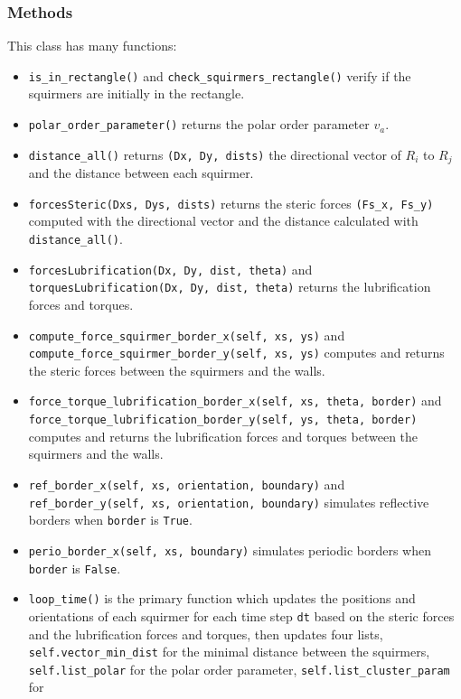 \documentclass{article}
\begin{document}
\subsubsection*{Methods}
This class has many functions:
\begin{itemize}
   \item \texttt{is\_in\_rectangle()} and \texttt{check\_squirmers\_rectangle()} verify if the squirmers 
    are initially in the rectangle.
   \item \texttt{polar\_order\_parameter()} returns the polar order parameter $v_a$.
   \item \texttt{distance\_all()} returns \texttt{(Dx, Dy, dists)} the directional vector of $R_{i}$ to $R_{j}$ 
   and the distance between each squirmer.
   \item \texttt{forcesSteric(Dxs, Dys, dists)} returns the steric forces \texttt{(Fs\_x, Fs\_y)} computed with the directional vector and the distance calculated with \texttt{distance\_all()}.
   \item \texttt{forcesLubrification(Dx, Dy, dist, theta)} and \texttt{torquesLubrification(Dx, Dy, dist, theta)}
   returns the lubrification forces and torques.
   \item \texttt{compute\_force\_squirmer\_border\_x(self, xs, ys)} and \\
   \texttt{compute\_force\_squirmer\_border\_y(self, xs, ys)}
   computes and returns the steric forces between the squirmers and the walls.
   \item \texttt{force\_torque\_lubrification\_border\_x(self, xs, theta, border)} and \texttt{force\_torque\_lubrification\_border\_y(self, ys, theta, border)}
   computes and returns the lubrification forces and torques between the squirmers and the walls.
   \item \texttt{ref\_border\_x(self, xs, orientation, boundary)} and \texttt{ref\_border\_y(self, xs, orientation, boundary)} simulates reflective borders when \texttt{border} is \texttt{True}.
   \item \texttt{perio\_border\_x(self, xs, boundary)} simulates periodic borders when \texttt{border} is \texttt{False}.
   \item \texttt{loop\_time()} is the primary function which updates the positions and orientations of each squirmer
   for each time step \texttt{dt} based on the steric forces and the lubrification forces and torques, then updates four lists, \texttt{self.vector\_min\_dist} for the minimal 
   distance between the squirmers, \texttt{self.list\_polar} for the polar order parameter, \texttt{self.list\_cluster\_param} for 

\end{itemize}
\end{document}
